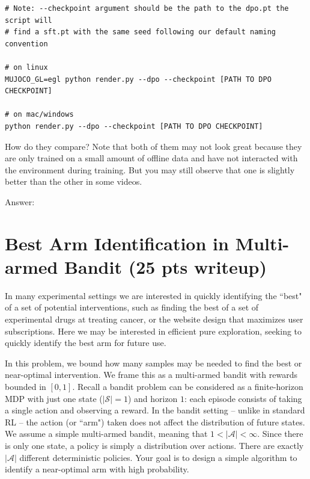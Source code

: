 \documentclass{article}
\newcommand{\answer}[1]{
    \begin{tcolorbox}[breakable]
    Answer: #1
    \end{tcolorbox}
    \clearpage
}
\begin{document}
\begin{enumerate}
{\small
\begin{tcolorbox}
\begin{verbatim}
# Note: --checkpoint argument should be the path to the dpo.pt the script will
# find a sft.pt with the same seed following our default naming convention

# on linux
MUJOCO_GL=egl python render.py --dpo --checkpoint [PATH TO DPO CHECKPOINT]

# on mac/windows
python render.py --dpo --checkpoint [PATH TO DPO CHECKPOINT]
\end{verbatim}
\end{tcolorbox}
}

How do they compare? Note that both of them may not look great because they are only trained on a small amount of offline data and have not interacted with the environment during training. But you may still observe that one is slightly better than the other in some videos.
\answer{

}

\end{enumerate}

\section{Best Arm Identification in Multi-armed Bandit (25 pts writeup)}

In many experimental settings we are interested in quickly identifying the ``best" of a set of potential interventions, such as finding the best of a set of experimental drugs at treating cancer, or the website design that maximizes user subscriptions. Here we may be interested in efficient pure exploration, seeking to quickly identify the best arm for future use. 

In this problem, we bound how many samples may be needed to find the best or near-optimal intervention. We frame this as a multi-armed bandit with rewards bounded in $[0,1]$. Recall a bandit problem can be considered as a finite-horizon MDP with just one state ($|\mathcal{S}| = 1$) and horizon $1$: each episode consists of taking a single action and observing a reward. In the bandit setting -- unlike in standard RL --  the action (or ``arm") taken does not affect the distribution of future states.
We assume a simple multi-armed bandit, meaning that $1 < |\mathcal{A}| < \infty$. Since there is only one state, a policy is simply a distribution over actions. There are exactly $|\mathcal{A}|$ different deterministic policies. Your goal is to design a simple algorithm to identify a near-optimal arm with high probability.
\end{document}
